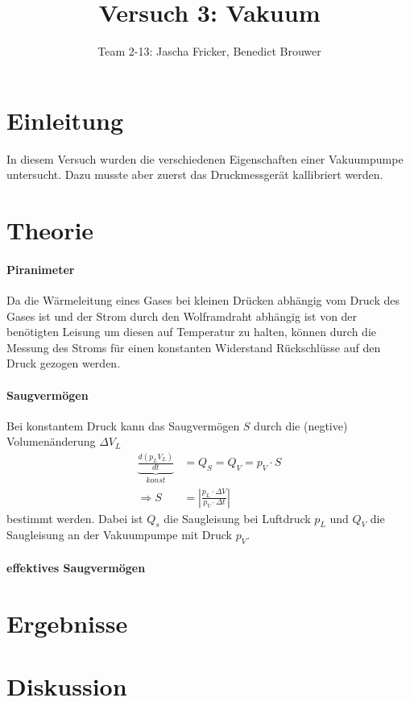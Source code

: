 \documentclass[11pt, a4paper]{article}
\title{Versuch 3: Vakuum}
\author{Team 2-13: Jascha Fricker, Benedict Brouwer}
\begin{document}
    \maketitle

    \tableofcontents

    \newpage

    \section{Einleitung}
    In diesem Versuch wurden die verschiedenen Eigenschaften einer Vakuumpumpe untersucht. Dazu musste aber zuerst das Druckmessgerät kallibriert werden.

    \section{Theorie}

    \paragraph{Piranimeter}
    Da die Wärmeleitung eines Gases bei kleinen Drücken abhängig vom Druck des Gases ist und der Strom durch den Wolframdraht abhängig ist von der benötigten Leisung um diesen auf Temperatur zu halten, können durch die Messung des Stroms für einen konstanten Widerstand Rückschlüsse auf den Druck gezogen werden.

    \paragraph{Saugvermögen} Bei konstantem Druck kann das Saugvermögen $S$ durch die (negtive) Volumenänderung $\Delta V_L$
    \begin{align}
        \underbrace{\frac{d(p_L V_L)}{dt}}_{konst} &= Q_S = Q_V = p_V \cdot S \\
        \Rightarrow S &= \left\lvert\frac{p_L \cdot \Delta V}{p_V \cdot \Delta t}\right\rvert
    \end{align}
    bestimmt werden. Dabei ist $Q_s$ die Saugleisung bei Luftdruck $p_L$ und $Q_V$ die Saugleisung an der Vakuumpumpe mit Druck $p_V$.

    \paragraph{effektives Saugvermögen}
    





    \section{Ergebnisse}

    \section{Diskussion}

    
    
\end{document}
